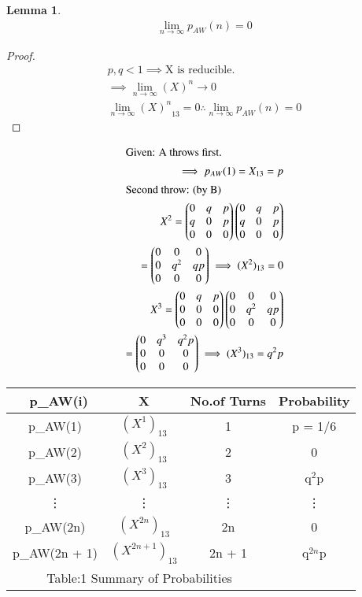 \documentclass[journal,12pt,twocolumn]{IEEEtran}
\theoremstyle{definition}
\newtheorem{lemma}[theorem]{Lemma}
\newcommand{\myvec}[1]{\ensuremath{\begin{pmatrix}#1\end{pmatrix}}}
\numberwithin{equation}{subsection}
\begin{document}
\begin{lemma} \large
    \begin{align*}
        \lim_{n \to \infty}p_{AW}(n) = 0
    \end{align*}
\end{lemma}
\begin{proof}
   \begin{align*}
      p , q < 1
      \implies \text{X is reducible.}\\
     \implies \lim_{n \to \infty} (X)^n \to 0\label{Eqn:2.1}\\
         \lim_{n \to \infty}{(X)^n}_{13} = 0
         \therefore \lim_{n \to \infty} p_{AW}(n) = 0
    \end{align*}
\end{proof}
\begin{align*}
    \intertext{Given: A throws first.}
    \implies p_{AW}(1) = X_{13} = p\\ 
    \intertext{Second throw: (by B)}
    X^2 = \myvec{0 & q & p\\ q & 0 & p\\ 0 & 0 & 0} \myvec{0 & q & p\\ q & 0 & p\\ 0 & 0 & 0}\\
    = \myvec{ 0 & 0 & 0\\0 & q^2 & qp\\0 & 0 & 0}
    \implies  (X^2)_{13} = 0\\
    X^3 = \myvec{ 0 & q & p\\0 & 0 & 0\\0 & 0 & 0}\myvec{ 0 & 0 & 0\\0 & q^2 & qp\\0 & 0 & 0}\\
    =\myvec{ 0 & q^3 & q^2p\\0 & 0 & 0\\0 & 0 & 0}
    \implies  (X^3)_{13} = q^2 p\\
\end{align*}
\centering \begin{tabular}{|c|c|c|c|}
    \hline\
    p_{AW}(i) & X&No.of Turns & Probability \\
    \hline
    p_{AW}(1) & $(X^1)_{13}$ & 1 & p = 1/6\\
    \hline
    p_{AW}(2) & $(X^2)_{13}$ & 2 & 0\\
    \hline
    p_{AW}(3) & $(X^3)_{13}$ & 3 & q$^2$p\\
    \hline
    \vdots & \vdots & \vdots & \vdots\\
    p_{AW}(2n) & $(X^{2n})_{13}$ & 2n & 0\\
    \hline
    p_{AW}(2n + 1) & $(X^{2n + 1})_{13}$ & 2n + 1 & q$^{2n}$p\\
    \hline
    \multicolumn{3}{c}{Table:1 Summary of Probabilities}\\
\end{tabular}
\end{document}
